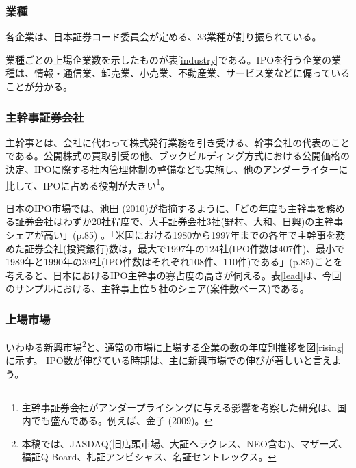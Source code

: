 \documentclass{jsarticle}
\begin{document}
\subsubsection{業種}
各企業は、日本証券コード委員会が定める、33業種が割り振られている。\par
業種ごとの上場企業数を示したものが表\ref{industry}である。IPOを行う企業の業種は、情報・通信業、卸売業、小売業、不動産業、サービス業などに偏っていることが分かる。

\subsubsection{主幹事証券会社}
主幹事とは、会社に代わって株式発行業務を引き受ける、幹事会社の代表のことである。公開株式の買取引受の他、ブックビルディング方式における公開価格の決定、IPOに際する社内管理体制の整備なども実施し、他のアンダーライターに比して、IPOに占める役割が大きい\footnote[11]{主幹事証券会社がアンダープライシングに与える影響を考察した研究は、国内でも盛んである。例えば、金子 (2009)\cite{kaneko}。}。\par
日本のIPO市場では、池田 (2010)\cite{ikeda2}が指摘するように、「どの年度も主幹事を務める証券会社はわずか20社程度で、大手証券会社3社(野村、大和、日興)の主幹事シェアが高い」(p.85) 。「米国における1980から1997年までの各年で主幹事を務めた証券会社(投資銀行)数は，最大で1997年の124社(IPO件数は407件)、最小で1989年と1990年の39社(IPO件数はそれぞれ108件、110件)である」(p.85)ことを考えると、日本におけるIPO主幹事の寡占度の高さが伺える。表\ref{lead}は、今回のサンプルにおける、主幹事上位５社のシェア(案件数ベース)である。\par

\subsubsection{上場市場}

いわゆる新興市場\footnote[12]{本稿では、JASDAQ(旧店頭市場、大証ヘラクレス、NEO含む)、マザーズ、福証Q-Board、札証アンビシャス、名証セントレックス。}と、通常の市場に上場する企業の数の年度別推移を図\ref{rising}に示す。 IPO数が伸びている時期は、主に新興市場での伸びが著しいと言えよう。
\end{document}
